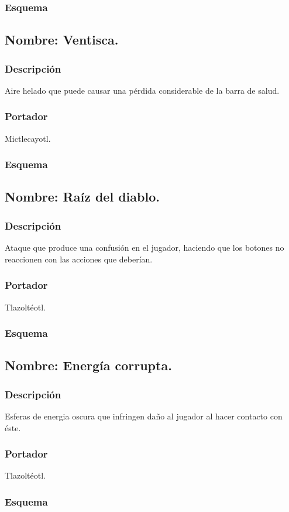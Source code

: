 \documentclass[11pt,letterpaper]{article}
\begin{document}
\subsubsection{Esquema}
\subsection{Nombre: Ventisca.}
\subsubsection{Descripción}
Aire helado que puede causar una pérdida considerable de la barra de salud.
\subsubsection{Portador}
Mictlecayotl.
\subsubsection{Esquema}
\subsection{Nombre: Raíz del diablo.}
\subsubsection{Descripción}
Ataque que produce una confusión en el jugador, haciendo que los botones no reaccionen con las acciones que deberían.
\subsubsection{Portador}
Tlazoltéotl.
\subsubsection{Esquema}
\subsection{Nombre: Energía corrupta.}
\subsubsection{Descripción}
Esferas de energia oscura que infringen daño al jugador al hacer contacto con éste.
\subsubsection{Portador}
Tlazoltéotl.
\subsubsection{Esquema}
	
\end{document}
